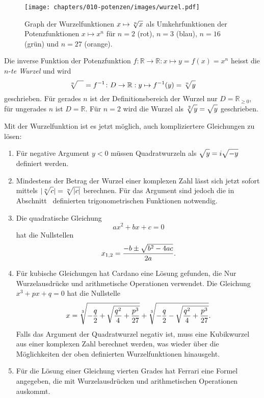 \begin{figure}
\centering
\texttt{[image: chapters/010-potenzen/images/wurzel.pdf]}
\caption[Graph der Wurzelfunktionen]{Graph der Wurzelfunktionen
\ensuremath{x\mapsto\root{n}\of{x}}
als Umkehrfunktionen der Potenzfunktionen $x\mapsto x^n$ für
$n=2$ ({\color{red}rot}), $n=3$ ({\color{blue}blau}),
$n=16$ ({\color{darkgreen}grün}) und $n=27$ ({\color{orange}orange}).
\label{buch:potenzen:fig:wurzel}
}
\end{figure}

\begin{definition}
Die inverse Funktion der Potenzfunktion
$f\colon \mathbb{R}\to\mathbb{R}:x\mapsto y=f(x)=x^n$
heisst die $n$-{\em te Wurzel} und wird
\[
\root{n}\of{\mathstrut\phantom{m}}
=
f^{-1}
\colon
D\to\mathbb{R}
:
y\mapsto f^{-1}(y)=\root{n}\of{\mathstrut y}
\]
geschrieben.
Für gerades $n$ ist der Definitionsbereich der Wurzel nur
$D=\mathbb{R}_{\ge 0}$, für ungerades $n$ ist $D=\mathbb{R}$.
Für $n=2$ wird die Wurzel als
\(
\root{2}\of{\mathstrut y}
=
\sqrt{\mathstrut y}
\)
geschrieben.
\end{definition}

Mit der Wurzelfunktion ist es jetzt möglich, auch kompliziertere
Gleichungen zu lösen:
\begin{enumerate}
\item
Für negative Argument $y<0$ müssen Quadratwurzeln als
$\sqrt{y\mathstrut}=i\sqrt{-y\mathstrut}$ definiert werden.
\item
Mindestens der Betrag der Wurzel einer komplexen Zahl lässt
sich jetzt sofort mittels $|\root{n}\of{c\mathstrut}|=\root{n}\of{|c|\mathstrut}$
berechnen.
Für das Argument sind jedoch die in
Abschnitt~\label{buch:geometrie:section:trigonometrisch} definierten
trigonometrischen Funktionen notwendig.
\item
Die quadratische Gleichung 
\[
ax^2+bx+c=0
\]
hat die Nullstellen
\[
x_{1,2} = \frac{-b\pm\sqrt{b^2-4ac\mathstrut}}{2a}.
\]
\item
Für kubische Gleichungen hat Cardano eine Lösung gefunden, die
Nur Wurzelausdrücke und arithmetische Operationen verwendet.
Die Gleichung $x^3+px+q=0$ hat die Nullstelle
\[
x
=
\root{3}\of{-\frac{q}2+\sqrt{\frac{q^2}4+\frac{p^3}{27}}}
+
\root{3}\of{-\frac{q}2-\sqrt{\frac{q^2}4+\frac{p^3}{27}}}.
\]
Falls das Argument der Quadratwurzel negativ ist, muss eine
Kubikwurzel aus einer komplexen Zahl berechnet werden, was
wieder über die Möglichkeiten der oben definierten Wurzelfunktionen
hinausgeht.
\item
Für die Lösung einer Gleichung vierten Grades hat Ferrari eine
Formel angegeben, die mit Wurzelausdrücken und arithmetischen
Operationen auskommt.
\end{enumerate}


